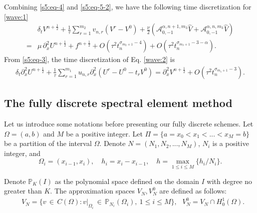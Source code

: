 \documentclass[10pt]{siamltex}
\newcommand{\px}[1][x]{\partial_{#1}}
\newcommand{\mfrac}[1][2]{\frac{1}{2}}
\begin{document}
Combining \eqref{s5:eq-4} and \eqref{s5:eq-5-2}, we have the following time discretization
for \eqref{wave:1}
\begin{equation}\label{s5:eq-6}\begin{aligned}
&\delta_tV^{n+\mfrac}+\frac{1}{\tau}\sum_{r=1}^{m_2} v_{n,r}({V}^{r}-V^0)
+\frac{\nu}{2}\left(\mathcal{{A}}_{0,-1}^{\alpha,n+1,m_3}\widehat{V}
+\mathcal{{A}}_{0,-1}^{\alpha,n,m_3}\widehat{V} \right)\\
=&\mu\,\px^2 U^{n+\mfrac}+f^{n+\mfrac}+O(\tau^2t_{n}^{\sigma_{m_2+1}-4})
+O(\tau^2t_{n}^{\sigma_{m_3+1}-3-\alpha}).
\end{aligned}\end{equation}
From \eqref{s5:eq-3},  the time discretization of  Eq. \eqref{wave:2} is \begin{equation}\label{s5:eq-7}\begin{aligned}
\delta_t \px^2 U^{n+\mfrac} +\frac{1}{\tau}\sum_{r=1}^{m_1} u_{n,r}\px[x]^2(U^r-U^0-t_rV^0)
= \px^2 V^{n+\mfrac}+O(\tau^2t_{n}^{\sigma_{m_1+1}-3}).
\end{aligned}\end{equation}



\subsection{The fully discrete spectral element method}
Let us introduce some notations before presenting our fully discrete schemes.
Let  $\Omega=(a,b)$  and $M$ be a positive integer.
Let $\Pi=\{a=x_0<x_1<...<x_{M}=b\}$
be a partition of the interval
$\Omega$.
Denote $N=(N_1,N_2,...,N_M)$,  $N_i$ is a positive integer, and
\begin{equation*}
\Omega_i=(x_{i-1},x_i),{\quad}h_i=x_{i}-x_{i-1},{\quad}h=\max_{1\leq i\leq M}\{{h_i}/{N_i}\}.
\end{equation*}

Denote $\mathbb{P}_{K}(I)$ as the polynomial space defined on the
domain $I$ with degree no greater than $K$. The approximation spaces
$V_N,V_N^0$ are defined as follows:
\begin{equation*}
 \begin{aligned}
&V_N=\{ v{\,\in\,}C(\Omega):v|_{\Omega_i} {\,\in\,} \mathbb{P}_{N_i}(\Omega_i),~1\leq{i}\leq{M}\},~~~V_N^{0}=V_N{\cap}H_0^1(\Omega).
\end{aligned}
\end{equation*}
\end{document}
